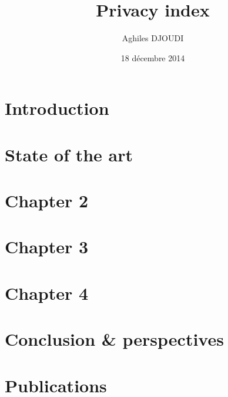 \documentclass[a4paper, 12pt, twoside,openright]{report}
\title     {Privacy index}
\author    {Aghiles DJOUDI}
\date{18 décembre 2014}
\begin{document}

\preface
	
	
	
	\setcounter{mtc}{2}

\body
	\chapter{Introduction}
		


    
	\chapter{State of the art}
	\minitoc
		
		
		
		
		

	\chapter{Chapter 2}
	\minitoc
		
		
		
		
		
		

	\chapter{Chapter 3}
	\minitoc
		
		
		
		
		
		

	\chapter{Chapter 4}
	\minitoc
		
		
		
		
		
		
	\chapter{Conclusion \& perspectives}
		
		
	\chapter{Publications}
		
\end{document}
